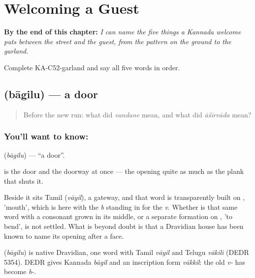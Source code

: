 
\chapter{Welcoming a Guest}
\label{ch:ka-welcome}

\begin{chapteropening}
\textbf{By the end of this chapter:} \emph{I can name the five things a Kannada welcome puts between the street and the guest, from the pattern on the ground to the garland.}

Complete KA-C52-garland and say all five words in order.
\end{chapteropening}

\section[\texorpdfstring{\kn{ಬಾಗಿಲು} (bāgilu)}{ಬಾಗಿಲು (bāgilu)}]{ (bāgilu) — a door}

\label{lesson:KA-C52-door}



\begin{quote}
Before the new run: what did \emph{vandane} mean, and what did \emph{āśīrvāda} mean?
\end{quote}

\subsection*{You'll want to know: }
\textbf{} (\emph{bāgilu}) — \textquotedblleft{}a door\textquotedblright{}.

 is the door and the doorway at once — the opening quite as much as the plank that shuts it.

Beside it sits Tamil  (\emph{vāyil}), a gateway, and that word is transparently built on , 'mouth', which is  here with the \emph{b} standing in for the \emph{v}. Whether  is that same word with a consonant grown in its middle, or a separate formation on , 'to bend', is not settled. What is beyond doubt is that a Dravidian house has been known to name its opening after a face.

\begin{cousinweb}
\textbf{} (\emph{bāgilu}) is native Dravidian, one word with Tamil \emph{vāyil} and Telugu \emph{vākili} (DEDR 5354). DEDR gives Kannada \emph{bāgil} and an inscription form \emph{vākkil}: the old \emph{v-} has become \emph{b-}.
\end{cousinweb}

